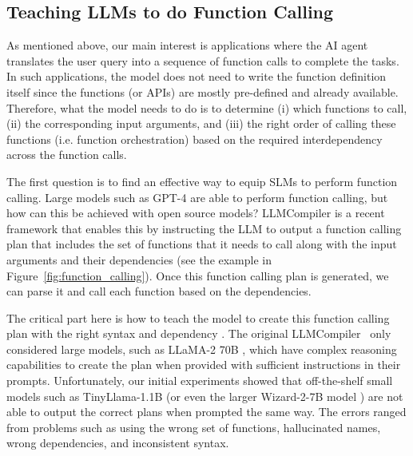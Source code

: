 \subsection{Teaching LLMs to do Function Calling}

As mentioned above, our main interest is applications where the AI agent translates the user query into a sequence of function calls to complete the tasks. In such applications, the model does not need to write the function definition itself since the functions (or APIs) are mostly pre-defined and already available. Therefore, what the model needs to do is to determine (i) which functions to call, (ii) the corresponding input arguments, and (iii) the right order of calling these functions (i.e. function orchestration) based on the required interdependency across the function calls.

The first question is to find an effective way to equip SLMs to perform function calling. Large models such as GPT-4 are able to perform function calling, but how can this be achieved with open source models? LLMCompiler \cite{kim2023llm} is a recent framework that enables this by instructing the LLM to output a function calling plan that includes the set of functions that it needs to call along with the input arguments and their dependencies (see the example in Figure~\ref{fig:function_calling}). Once this function calling plan is generated, we can parse it and call each function based on the dependencies.

The critical part here is how to teach the model to create this function calling plan with the right syntax and dependency
. The original LLMCompiler~\cite{kim2023llm} only considered large models, such as LLaMA-2 70B \cite{touvron2023llama}, which have complex reasoning capabilities to create the plan when provided with sufficient instructions in their prompts. 
Unfortunately, our initial experiments showed that off-the-shelf small models such as TinyLlama-1.1B \cite{zhang2024tinyllama} (or even the larger Wizard-2-7B model \cite{huggingface_notwizardlm}) are not able to output the correct plans when prompted the same way.
The errors ranged from problems such as using the wrong set of functions, hallucinated names, wrong dependencies, and inconsistent syntax.



